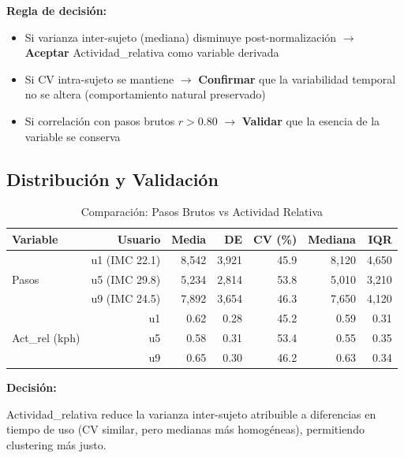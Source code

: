 \documentclass[12pt,letterpaper,twoside]{report}
\begin{document}
\begin{reglabox}
\textbf{Regla de decisión:}

\begin{itemize}[noitemsep]
    \item Si varianza inter-sujeto (mediana) disminuye post-normalización $\to$ \textbf{Aceptar} Actividad\_relativa como variable derivada
    \item Si CV intra-sujeto se mantiene $\to$ \textbf{Confirmar} que la variabilidad temporal no se altera (comportamiento natural preservado)
    \item Si correlación con pasos brutos $r > 0.80$ $\to$ \textbf{Validar} que la esencia de la variable se conserva
\end{itemize}
\end{reglabox}

\subsection{Distribución y Validación}

\begin{table}[H]
\centering
\caption{Comparación: Pasos Brutos vs Actividad Relativa}
\label{tab:activity_comparison}
\begin{tabular}{@{}lrrrrrr@{}}
\toprule
\textbf{Variable} & \textbf{Usuario} & \textbf{Media} & \textbf{DE} & \textbf{CV (\%)} & \textbf{Mediana} & \textbf{IQR} \\
\midrule
\multirow{3}{*}{Pasos} 
    & u1 (IMC 22.1) & 8,542 & 3,921 & 45.9 & 8,120 & 4,650 \\
    & u5 (IMC 29.8) & 5,234 & 2,814 & 53.8 & 5,010 & 3,210 \\
    & u9 (IMC 24.5) & 7,892 & 3,654 & 46.3 & 7,650 & 4,120 \\
\midrule
\multirow{3}{*}{Act\_rel (kph)} 
    & u1 & 0.62 & 0.28 & 45.2 & 0.59 & 0.31 \\
    & u5 & 0.58 & 0.31 & 53.4 & 0.55 & 0.35 \\
    & u9 & 0.65 & 0.30 & 46.2 & 0.63 & 0.34 \\
\bottomrule
\end{tabular}
\end{table}

\begin{decisionbox}
\textbf{Decisión:}

Actividad\_relativa reduce la varianza inter-sujeto atribuible a diferencias en tiempo de uso (CV similar, pero medianas más homogéneas), permitiendo clustering más justo.
\end{decisionbox}
\end{document}
